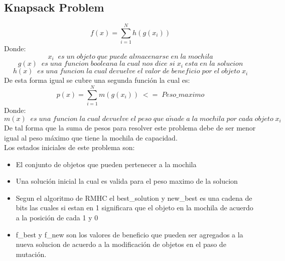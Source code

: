 \documentclass[10pt]{article}
\begin{document}
\subsection{Knapsack Problem}
\[f(x)=\sum_{i=1}^{N}h\left(g\left(x_{i}\right)\right)\]
Donde:
\[x_{i}\;\;es\;un\;objeto\;que\;puede\;almacenarse\;en\;la\;mochila\]
\[g(x)\;\;es\;una\;funcion\;booleana\;la\;cual\;nos\;dice\;si\;x_{i}\;esta\;en\;la\;solucion\]
\[h(x)\;\;es\;una\;funcion\;la\;cual\;devuelve\;el\;valor\;de\;beneficio\;por\;el\;objeto\;x_{i}\]
De esta forma igual se cubre una segunda función la cual es:
\[p(x)=\sum_{i=1}^{N}m\left(g(x_{i})\right)\;<=\;Peso\_maximo\]
Donde:
\[m(x)\;\;es\;una\;funcion\;la\;cual\;devuelve\;el\;peso\;que\;a\tilde{n}ade\;a\;la\;mochila\;por\;cada\;objeto\;x_{i}\]
De tal forma que la suma de pesos para resolver este problema debe de ser menor igual al peso máximo que tiene la mochila de capacidad.\\
Los estados iniciales de este problema son:
\begin{itemize}
  \item El conjunto de objetos que pueden pertenecer a la mochila
  \item Una solución inicial la cual es valida para el peso maximo de la solucion
  \item Segun el algoritmo de RMHC el best\_solution y new\_best es una cadena de bits las cuales si estan en 1 significara que el objeto en la mochila de acuerdo a la posición de cada 1 y 0
  \item f\_best y f\_new son los valores de beneficio que pueden ser agregados a la nueva solucion de acuerdo a la modificación de objetos en el paso de mutación.
\end{itemize}
\end{document}
